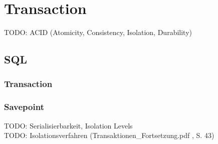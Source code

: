 \section{Transaction}
    TODO: ACID (Atomicity, Consistency, Isolation, Durability) \\
    \subsection{SQL}
        \subsubsection{Transaction}
            
        \subsubsection{Savepoint}
            
    TODO: Serialisierbarkeit, Isolation Levels \\
    TODO: Isolationsverfahren (Transaktionen\_Fortsetzung.pdf , S. 43)